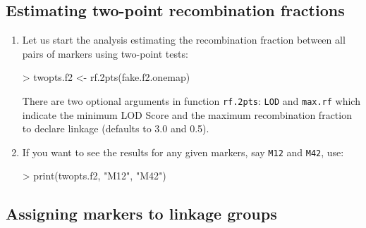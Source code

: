 \documentclass[letterpaper,12pt,oneside]{article}
\begin{document}
\subsection{Estimating two-point recombination fractions}
\begin{enumerate}
\item Let us start the analysis estimating the recombination fraction between all pairs of markers using two-point tests:

\begin{Schunk}
\begin{Sinput}
> twopts.f2 <- rf.2pts(fake.f2.onemap)
\end{Sinput}
\end{Schunk}

There are two optional arguments in function {\tt rf.2pts}: {\tt LOD} and {\tt max.rf} which indicate the minimum LOD Score and the maximum recombination fraction to declare linkage (defaults to 3.0 and 0.5).

\item If you want to see the results for any given markers, say {\tt M12} and {\tt M42}, use:
\begin{Schunk}
\begin{Sinput}
> print(twopts.f2, "M12", "M42")
\end{Sinput}
\end{Schunk}

\end{enumerate}

\subsection{Assigning markers to linkage groups}
\end{document}

